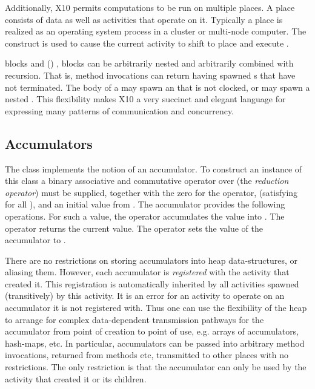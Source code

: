Additionally, X10 permits computations to be run on multiple places. A
place consists of data as well as activities that operate on
it. Typically a place is realized as  an operating system process in a
cluster or multi-node computer. The  construct is used
to cause the current activity to shift to place  and execute
.

 blocks and () , 
blocks can be arbitrarily nested and arbitrarily combined with
recursion. That is, method invocations can return having spawned
s that have not terminated. The body  of a
 may spawn an  that is not
clocked, or may spawn a nested .
This flexibility makes X10 a very succinct and elegant
language for expressing many patterns of communication and
concurrency.

\subsection{Accumulators}

The class  implements the notion of an accumulator. To
construct an instance of this class a binary associative and
commutative operator   over  (the {\em reduction operator}) must be supplied,
together with the zero for the operator,  (satisfying 
  for all ), and an initial value from . The accumulator
  provides the following operations. For  such a value, the
  operator  accumulates the value  into
  . The operator  returns the current value. The
  operator  sets the value of the accumulator to
  .

There are no restrictions on storing accumulators into heap
data-structures, or aliasing them.  However, each accumulator is {\em
  registered} with the activity that created it. This registration is
automatically inherited by all activities spawned (transitively) by
this activity. It is an error for an activity to operate on an
accumulator it is not registered with.  Thus one can use the
flexibility of the heap to arrange for complex data-dependent
transmission pathways for the accumulator from point of creation to
point of use, e.g.{} arrays of accumulators, hash-maps, etc. In
particular, accumulators can be passed into arbitrary method
invocations, returned from methods etc, transmitted to other places
with no restrictions. The only restriction is that the accumulator can
only be used by the activity that created it or its children.

